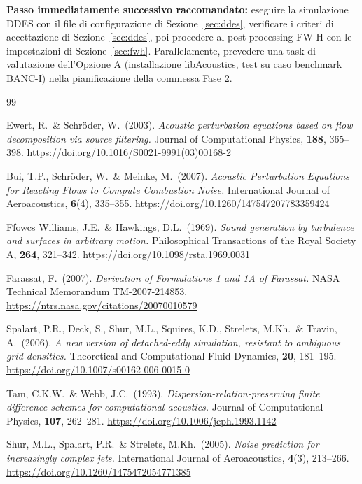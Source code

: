 \documentclass[11pt,a4paper]{article}
\begin{document}
\medskip
\textbf{Passo immediatamente successivo raccomandato:} eseguire la
simulazione DDES con il file di configurazione di Sezione~\ref{sec:ddes},
verificare i criteri di accettazione di Sezione~\ref{sec:ddes}, poi
procedere al post-processing FW-H con le impostazioni di Sezione~\ref{sec:fwh}.
Parallelamente, prevedere una task di valutazione dell'Opzione A
(installazione libAcoustics, test su caso benchmark BANC-I) nella
pianificazione della commessa Fase 2.

\clearpage
\begin{thebibliography}{99}
\setlength{\itemsep}{4pt}

Ewert, R.\ \& Schröder, W.\ (2003).
\textit{Acoustic perturbation equations based on flow decomposition via source filtering.}
Journal of Computational Physics, \textbf{188}, 365–398.
\url{https://doi.org/10.1016/S0021-9991(03)00168-2}

Bui, T.P., Schröder, W.\ \& Meinke, M.\ (2007).
\textit{Acoustic Perturbation Equations for Reacting Flows to Compute Combustion Noise.}
International Journal of Aeroacoustics, \textbf{6}(4), 335–355.
\url{https://doi.org/10.1260/147547207783359424}

Ffowcs Williams, J.E.\ \& Hawkings, D.L.\ (1969).
\textit{Sound generation by turbulence and surfaces in arbitrary motion.}
Philosophical Transactions of the Royal Society A, \textbf{264}, 321–342.
\url{https://doi.org/10.1098/rsta.1969.0031}

Farassat, F.\ (2007).
\textit{Derivation of Formulations 1 and 1A of Farassat.}
NASA Technical Memorandum TM-2007-214853.
\url{https://ntrs.nasa.gov/citations/20070010579}

Spalart, P.R., Deck, S., Shur, M.L., Squires, K.D., Strelets, M.Kh.\ \& Travin, A.\ (2006).
\textit{A new version of detached-eddy simulation, resistant to ambiguous grid densities.}
Theoretical and Computational Fluid Dynamics, \textbf{20}, 181–195.
\url{https://doi.org/10.1007/s00162-006-0015-0}

Tam, C.K.W.\ \& Webb, J.C.\ (1993).
\textit{Dispersion-relation-preserving finite difference schemes for computational acoustics.}
Journal of Computational Physics, \textbf{107}, 262–281.
\url{https://doi.org/10.1006/jcph.1993.1142}

Shur, M.L., Spalart, P.R.\ \& Strelets, M.Kh.\ (2005).
\textit{Noise prediction for increasingly complex jets.}
International Journal of Aeroacoustics, \textbf{4}(3), 213–266.
\url{https://doi.org/10.1260/1475472054771385}


\end{thebibliography}
\end{document}
